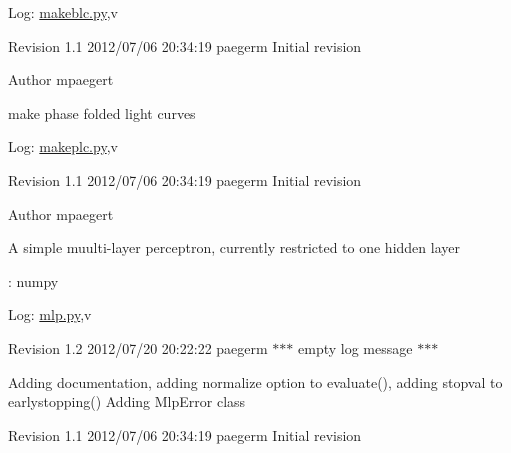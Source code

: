 \begin{DoxyParagraph}{Log:}
\hyperlink{makeblc_8py}{makeblc.py},v 
\end{DoxyParagraph}
Revision 1.1 2012/07/06 20:34:19 paegerm Initial revision

\begin{DoxyAuthor}{Author}
mpaegert 
\end{DoxyAuthor}
make phase folded light curves

\begin{DoxyParagraph}{Log:}
\hyperlink{makeplc_8py}{makeplc.py},v 
\end{DoxyParagraph}
Revision 1.1 2012/07/06 20:34:19 paegerm Initial revision

\begin{DoxyAuthor}{Author}
mpaegert 
\end{DoxyAuthor}
A simple muulti-\/layer perceptron, currently restricted to one hidden layer

: numpy

\begin{DoxyParagraph}{Log:}
\hyperlink{mlp_8py}{mlp.py},v 
\end{DoxyParagraph}
Revision 1.2 2012/07/20 20:22:22 paegerm $\ast$$\ast$$\ast$ empty log message $\ast$$\ast$$\ast$

Adding documentation, adding normalize option to evaluate(), adding stopval to earlystopping() Adding MlpError class

Revision 1.1 2012/07/06 20:34:19 paegerm Initial revision 